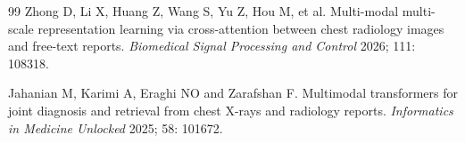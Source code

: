 \documentclass[Afour,sagev,times]{sagej}
\begin{document}
\begin{thebibliography}{99}
Zhong D, Li X, Huang Z, Wang S, Yu Z, Hou M, et al. Multi-modal multi-scale representation learning via cross-attention between chest radiology images and free-text reports. \textit{Biomedical Signal Processing and Control} 2026; 111: 108318.

Jahanian M, Karimi A, Eraghi NO and Zarafshan F. Multimodal transformers for joint diagnosis and retrieval from chest X-rays and radiology reports. \textit{Informatics in Medicine Unlocked} 2025; 58: 101672.

\end{thebibliography}
\end{document}
